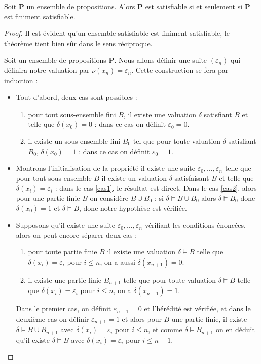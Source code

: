 \begin{them}
    Soit $\mathbf P$ un ensemble de propositions. Alors $\mathbf P$ est satisfiable si et seulement si $\mathbf P$ est finiment satisfiable.
\end{them}

\begin{proof}
    Il est évident qu'un ensemble satisfiable est finiment satisfiable, le théorème tient bien sûr dans le sens réciproque.

    Soit un ensemble de propositions $\mathbf P$. Nous allons définir une suite $(\varepsilon_n)$ qui définira notre valuation par $\nu(x_n)=\varepsilon_n$. Cette construction se fera par induction :
    \begin{itemize}[label=$\bullet$]
        \item Tout d'abord, deux cas sont possibles :
        \begin{enumerate}
            \item\label{cas1} pour tout sous-ensemble fini $B$, il existe une valuation $\delta$ satisfiant $B$ et telle que $\delta(x_0)=0$ : dans ce cas on définit $\varepsilon_0 = 0$.
            \item\label{cas2} il existe un sous-ensemble fini $B_0$ tel que pour toute valuation $\delta$ satisfiant $B_0$, $\delta(x_0)=1$ : dans ce cas on définit $\varepsilon_0 = 1$.
        \end{enumerate} 
        \item Montrons l'initialisation de la propriété \og il existe une suite $\varepsilon_0,\ldots,\varepsilon_n$ telle que pour tout sous-ensemble $B$ il existe un valuation $\delta$ satisfaisant $B$ et telle que $\delta(x_i)=\varepsilon_i$\fg{} : dans le cas \ref{cas1}, le résultat est direct. Dans le cas \ref{cas2}, alors pour une partie finie $B$ on considère $B\cup B_0$ : si $\delta\models B\cup B_0$ alors $\delta\models B_0$ donc $\delta(x_0)=1$ et $\delta\models B$, donc notre hypothèse est vérifiée.
        \item Supposons qu'il existe une suite $\varepsilon_0,\ldots,\varepsilon_n$ vérifiant les conditions énoncées, alors on peut encore séparer deux cas :
        \begin{enumerate}
            \item pour toute partie finie $B$ il existe une valuation $\delta\models B$ telle que $\delta(x_i)=\varepsilon_i$ pour $i\leq n$, on a aussi $\delta(x_{n+1})=0$.
            \item il existe une partie finie $B_{n+1}$ telle que pour toute valuation $\delta\models B$ telle que $\delta(x_i) =\varepsilon_i$ pour $i\leq n$, on a $\delta(x_{n+1})=1$.
        \end{enumerate}
        Dans le premier cas, on définit $\varepsilon_{n+1}=0$ et l'hérédité est vérifiée, et dans le deuxième cas on définir $\varepsilon_{n+1}=1$ et alors pour $B$ une partie finie, il existe $\delta\models B \cup B_{n+1}$ avec $\delta(x_i)=\varepsilon_i$ pour $i\leq n$, et comme $\delta\models B_{n+1}$ on en déduit qu'il existe $\delta\models B$ avec $\delta(x_i) =\varepsilon_i$ pour $i\leq n+1$.
    \end{itemize}


\end{proof}
